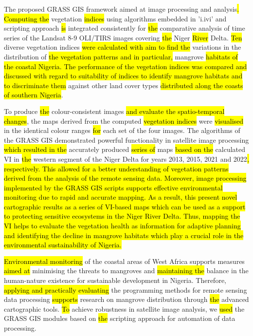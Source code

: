 \documentclass[jmse,article,submit,pdftex,moreauthors]{Definitions/mdpi}
\begin{document}
The proposed GRASS GIS framework aimed at image processing and analysis\hl{. Computing the} vegetation \hl{indices} using algorithms embedded in 'i.ivi' and scripting approach \hl{is} integrated consistently for \hl{the }comparative analysis of time series of the Landsat 8-9 OLI/TIRS images covering \hl{the }Niger \hl{River }Delta. \hl{Ten} diverse vegetation indices \hl{were calculated with aim to find the }variations in the distribution of \hl{the vegetation patterns and in particular, }mangrove \hl{habitats of the coastal Nigeria. The performance of the vegetation indices was compared and discussed with regard to suitability of indices to identify mangrove habitats and to discriminate them} against other land cover types \hl{distributed along the coasts of southern Nigeria}. 

To produce \hl{the }colour-consistent images \hl{and evaluate the spatio-temporal changes}, the maps derived from the computed \hl{vegetation indices} were \hl{visualised} in the identical colour ranges \hl{for} each set of the four images. The algorithms of the GRASS GIS demonstrated powerful functionality in satellite image processing \hl{which resulted in the} accurately produced \hl{series of }maps \hl{based on the }calculated VI in \hl{the }western segment of the Niger Delta for years 2013, 2015, 2021 and 2022\hl{, respectively. This allowed for a better understanding of vegetation patterns derived from the analysis of the remote sensing data. Moreover, image processing implemented by the GRASS GIS scripts supports effective environmental monitoring due to rapid and accurate mapping. As a result, this present novel cartographic results as a series of VI-based maps which can be used as a support to protecting sensitive ecosystems in the Niger River Delta. Thus, mapping the VI helps to evaluate the vegetation health as information for adaptive planning and identifying the decline in mangrove habitats which play a crucial role in the environmental sustainability of Nigeria.} 

\hl{Environmental monitoring }of the\hl{ }coastal areas of West Africa supports\hl{ }measures \hl{aimed at} minimising the threats to mangroves and \hl{maintaining the} balance in the human-nature existence for sustainable\hl{ }development in Nigeria. Therefore, \hl{applying and practically evaluating} the programming methods for remote sensing data processing \hl{supports} research on mangrove distribution through \hl{the} advanced cartographic tools. \hl{To} achieve robustness in satellite image analysis, we \hl{used} the GRASS GIS modules based on \hl{the }scripting approach for automation of\hl{ }data processing.
\end{document}
